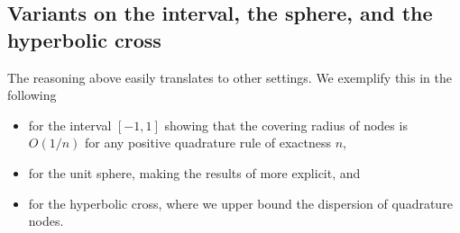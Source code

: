 \documentclass[11pt,a4paper,twoside,final,biblatex]{scrartcl}
\theoremstyle{definition}
\numberwithin{equation}{section}
\numberwithin{table}{section}
\numberwithin{figure}{section}
\begin{document}
\subsection{Variants on the interval, the sphere, and the hyperbolic cross}\label{sec:gen}
 The reasoning above easily translates to other settings. We exemplify this in the following
 \begin{itemize}
     \item for the interval $[-1,1]$ showing that the covering radius of nodes is $O(1/n)$ for any positive quadrature rule of exactness $n$,
     \item for the unit sphere, making the results of \cite{EhGr23} more explicit, and
     \item for the hyperbolic cross, where we upper bound the dispersion of quadrature nodes. 
 \end{itemize}
\end{document}
